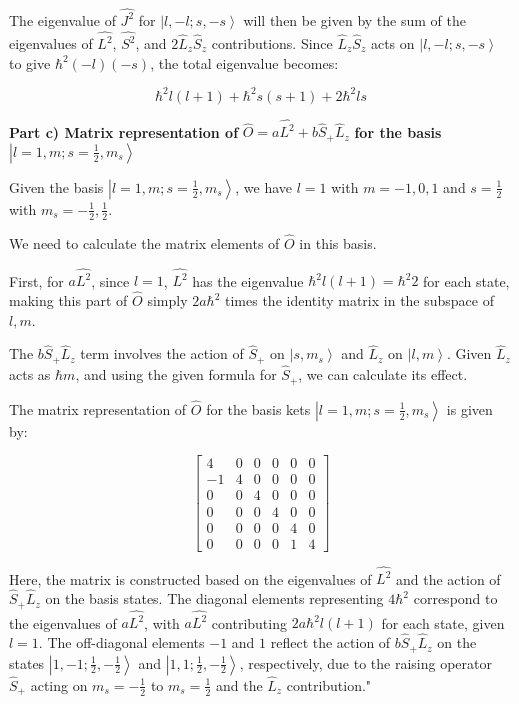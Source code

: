 The eigenvalue of \( \hat{J^{2}} \) for \( \left|l, -l; s, -s \right> \) will then be given by the sum of the eigenvalues of \( \hat{L^{2}} \), \( \hat{S^{2}} \), and \( 2\hat{L}_{z}\hat{S}_{z} \) contributions. Since \( \hat{L}_{z}\hat{S}_{z} \) acts on \( \left|l, -l; s, -s \right> \) to give \( \hbar^2 (-l)(-s) \), the total eigenvalue becomes:

\[ \hbar^2 l(l+1) + \hbar^2 s(s+1) + 2\hbar^2 ls \]

\textbf{Part c) Matrix representation of} \( \hat{O} = a\hat{L^{2}} + b\hat{S}_{+}\hat{L}_{z} \) \textbf{for the basis} \( \left|l=1, m; s=\frac{1}{2}, m_{s} \right> \)

Given the basis \( \left|l=1, m; s=\frac{1}{2}, m_{s} \right> \), we have \( l=1 \) with \( m = -1, 0, 1 \) and \( s=\frac{1}{2} \) with \( m_{s} = -\frac{1}{2}, \frac{1}{2} \).

We need to calculate the matrix elements of \( \hat{O} \) in this basis.

First, for \( a\hat{L^{2}} \), since \( l=1 \), \( \hat{L^{2}} \) has the eigenvalue \( \hbar^2 l(l+1) = \hbar^2 2 \) for each state, making this part of \( \hat{O} \) simply \( 2a\hbar^2 \) times the identity matrix in the subspace of \( l, m \).

The \( b\hat{S}_{+}\hat{L}_{z} \) term involves the action of \( \hat{S}_{+} \) on \( \left|s, m_{s} \right> \) and \( \hat{L}_{z} \) on \( \left|l, m \right> \). Given \( \hat{L}_{z} \) acts as \( \hbar m \), and using the given formula for \( \hat{S}_{+} \), we can calculate its effect.

The matrix representation of \( \hat{O} \) for the basis kets \( \left|l=1, m; s=\frac{1}{2}, m_{s} \right> \) is given by:

\[
\begin{bmatrix}
4 & 0 & 0 & 0 & 0 & 0 \\
-1 & 4 & 0 & 0 & 0 & 0 \\
0 & 0 & 4 & 0 & 0 & 0 \\
0 & 0 & 0 & 4 & 0 & 0 \\
0 & 0 & 0 & 0 & 4 & 0 \\
0 & 0 & 0 & 0 & 1 & 4
\end{bmatrix}
\]

Here, the matrix is constructed based on the eigenvalues of \( \hat{L^{2}} \) and the action of \( \hat{S}_{+}\hat{L}_{z} \) on the basis states. The diagonal elements representing \( 4\hbar^2 \) correspond to the eigenvalues of \( a\hat{L^{2}} \), with \( a\hat{L^{2}} \) contributing \( 2a\hbar^2 l(l+1) \) for each state, given \( l=1 \). The off-diagonal elements \( -1 \) and \( 1 \) reflect the action of \( b\hat{S}_{+}\hat{L}_{z} \) on the states \( \left|1, -1; \frac{1}{2}, -\frac{1}{2} \right> \) and \( \left|1, 1; \frac{1}{2}, -\frac{1}{2} \right> \), respectively, due to the raising operator \( \hat{S}_{+} \) acting on \( m_{s} = -\frac{1}{2} \) to \( m_{s} = \frac{1}{2} \) and the \( \hat{L}_{z} \) contribution."

